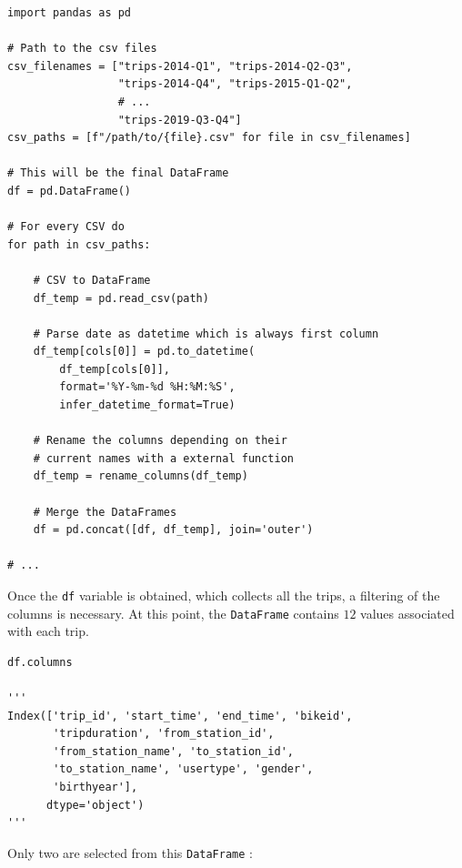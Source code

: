 \begin{verbatim}
import pandas as pd

# Path to the csv files
csv_filenames = ["trips-2014-Q1", "trips-2014-Q2-Q3", 
                 "trips-2014-Q4", "trips-2015-Q1-Q2",
                 # ...
                 "trips-2019-Q3-Q4"]
csv_paths = [f"/path/to/{file}.csv" for file in csv_filenames]

# This will be the final DataFrame
df = pd.DataFrame()

# For every CSV do
for path in csv_paths:
    
    # CSV to DataFrame
    df_temp = pd.read_csv(path)
    
    # Parse date as datetime which is always first column
    df_temp[cols[0]] = pd.to_datetime(
        df_temp[cols[0]], 
        format='%Y-%m-%d %H:%M:%S',
        infer_datetime_format=True)
    
    # Rename the columns depending on their
    # current names with a external function
    df_temp = rename_columns(df_temp)
    
    # Merge the DataFrames
    df = pd.concat([df, df_temp], join='outer')

# ...
\end{verbatim}


Once the \small{\verb|df|} \normalsize  variable is obtained, which collects all the trips, a filtering of the columns is necessary. At this point, the \small{\verb|DataFrame|} \normalsize  contains $12$ values associated with each trip. 

\begin{verbatim}
df.columns

'''
Index(['trip_id', 'start_time', 'end_time', 'bikeid', 
       'tripduration', 'from_station_id', 
       'from_station_name', 'to_station_id',
       'to_station_name', 'usertype', 'gender',
       'birthyear'],
      dtype='object')
'''
\end{verbatim}

Only two are selected from this \small{\verb|DataFrame|} \normalsize :

